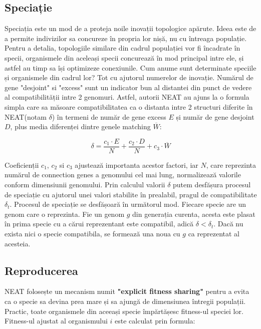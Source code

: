 \subsection{Speciație}\label{Speciatie}
Speciația este un mod de a proteja noile inovații topologice apărute.
Ideea este de a permite indivizilor sa concureze în propria lor nișă, nu cu întreaga populație.
Pentru a detalia, topologiile similare din cadrul populației vor fi încadrate în specii, organismele din aceleași specii concurează în mod principal intre ele, și astfel au timp sa își optimizeze conexiunile.
Cum anume sunt determinate speciile și organismele din cadrul lor? Tot cu ajutorul numerelor de inovație. 
Numărul de gene "desjoint" si "excess" sunt un indicator bun al distantei din punct de vedere al compatibilității intre 2 genomuri.
Astfel, autorii NEAT au ajuns la o formula simpla care sa măsoare compatibilitatea ca o distanta intre 2 structuri diferite în NEAT(notam $\delta$) în termeni de număr de gene excess $E$ și număr de gene desjoint $D$, plus media diferenței dintre genele matching $\overline{W}$:

\begin{equation}\label{eq:compatibility}
    \delta = \frac{c_1 \cdot E}{N} + \frac{c_2 \cdot D}{N} + c_3 \cdot \overline{W} 
\end{equation}

Coeficienții $c_1$, $c_2$ si $c_3$ ajustează importanta acestor factori, iar $N$, care reprezinta numărul de connection genes a genomului cel mai lung, normalizează valorile conform dimensiunii genomului.
Prin calculul valorii $\delta$ putem desfășura procesul de speciație cu ajutorul unei valori stabilite în prealabil, pragul de compatibilitate $\delta_t$.
Procesul de speciație se desfășoară în următorul mod.
Fiecare specie are un genom care o reprezinta. Fie un genom $g$ din generația curenta, acesta este plasat în prima specie cu a cărui reprezentant este compatibil, adică  $\delta < \delta_t$.
Dacă nu exista nici o specie compatibila, se formează una noua cu $g$ ca reprezentat al acesteia.

\subsection{Reproducerea}\label{Reproducerea}
NEAT folosește un mecanism numit \textbf{"explicit fitness sharing"} pentru a evita ca o specie sa devina prea mare și sa ajungă de dimensiunea întregii populații.
Practic, toate organismele din aceeași specie împărtășesc fitness-ul speciei lor.
Fitness-ul ajustat al organismului $i$ este calculat prin formula:

